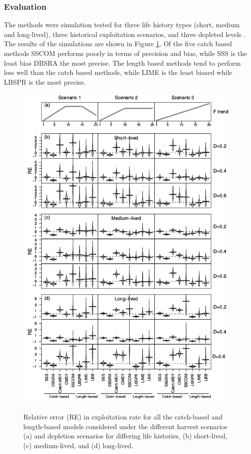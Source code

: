 \subsubsection*{Evaluation}

The methods were simulation tested for three life history types (short, medium and long-lived), three historical exploitation scenarios, and three depleted levels \citep{pons2019catchlen}. The results of the simulations are shown in Figure \ref{fig:cln}. Of the five catch based methods SSCOM performs poorly in terms of precision and bias, while SSS is the least bias DBSRA the most precise. The length based methods tend to perform less well than the catch based methods, while LIME is the least biased while LBSPR is the most precise.

\begin{figure}[h!]\centering\includegraphics[width=6in]{figs/Figure_1.png}\label{fig:cln}\caption{Relative error (RE) in exploitation rate for all the catch-based and length-based models considered under the different harvest scenarios (a) and depletion scenarios for differing life histories, (b) short-lived, (c) medium-lived, and (d) long-lived.}
\end{figure}

